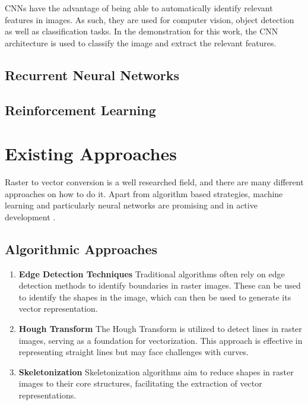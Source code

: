 \documentclass[12pt, a4paper, titlepage]{report}
\begin{document}
CNNs have the advantage of being able to automatically identify relevant features in images. As such, they are used for computer vision, object detection as well as classification tasks. In the demonstration for this work, the CNN architecture is used to classify the image and extract the relevant features.


\subsection{Recurrent Neural Networks}
\subsection{Reinforcement Learning}


\section{Existing Approaches}

Raster to vector conversion is a well researched field, and there are many different approaches on how to do it. Apart from algorithm based strategies, machine learning and particularly neural networks are promising and in active development \cite{dziuba_image_2023}.

\subsection{Algorithmic Approaches}

\begin{enumerate}[label=\Roman*]
   \item \textbf{Edge Detection Techniques} Traditional algorithms often rely on edge detection methods to identify boundaries in raster images. These can be used to identify the shapes in the image, which can then be used to generate its vector representation.

   \item \textbf{Hough Transform} The Hough Transform is utilized to detect lines in raster images, serving as a foundation for vectorization. This approach is effective in representing straight lines but may face challenges with curves.

   \item \textbf{Skeletonization} Skeletonization algorithms aim to reduce shapes in raster images to their core structures, facilitating the extraction of vector representations.
\end{enumerate}
\end{document}
